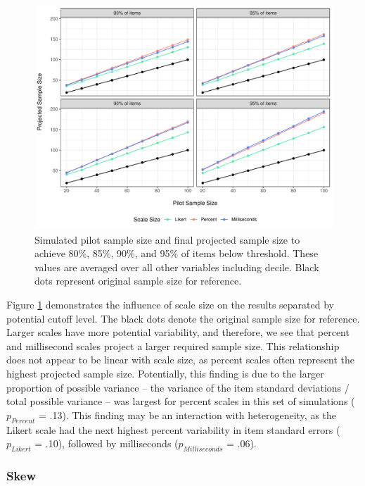 \documentclass[
  man]{apa7}
\begin{document}
\begin{figure}
\centering
\includegraphics{manuscript_draft_files/figure-latex/scale-size-figure-1.pdf}
\caption{\label{fig:scale-size-figure}Simulated pilot sample size and final projected sample size to achieve 80\%, 85\%, 90\%, and 95\% of items below threshold. These values are averaged over all other variables including decile. Black dots represent original sample size for reference.}
\end{figure}

Figure \ref{fig:scale-size-figure} demonstrates the influence of scale size on the results separated by potential cutoff level. The black dots denote the original sample size for reference. Larger scales have more potential variability, and therefore, we see that percent and millisecond scales project a larger required sample size. This relationship does not appear to be linear with scale size, as percent scales often represent the highest projected sample size. Potentially, this finding is due to the larger proportion of possible variance -- the variance of the item standard deviations / total possible variance -- was largest for percent scales in this set of simulations (\(p_{Percent}\) = .13). This finding may be an interaction with heterogeneity, as the Likert scale had the next highest percent variability in item standard errors (\(p_{Likert}\) = .10), followed by milliseconds (\(p_{Milliseconds}\) = .06).

\hypertarget{skew}{%
\subsubsection{Skew}\label{skew}}
\end{document}
